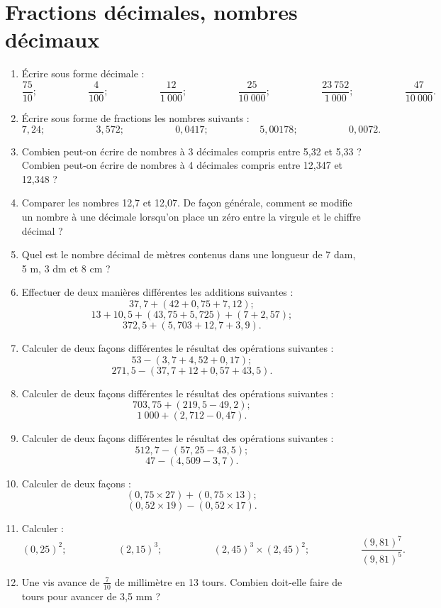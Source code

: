 
 \chapter{Fractions décimales, nombres décimaux}
 
 \begin{enumerate}
 \item Écrire sous forme décimale : 
 \[ \frac{75}{10};\phantom{meowmeow}\frac4{100};\phantom{meowmeow}\frac{12}{1~000};\phantom{meowmeow}\frac{25}{10~000};\phantom{meowmeow}\frac{23~752}{1~000};\phantom{meowmeow}\frac{47}{10~000}.\]
 \item Écrire sous forme de fractions les nombres suivants : 
 \[7,24; \phantom{meowmeow} 3,572;\phantom{meowmeow}
 0,0417;\phantom{meowmeow}5,00178;\phantom{meowmeow}
 0,0072.\]
 \item Combien peut-on écrire de nombres à 3 décimales compris entre 5,32 et 5,33 ? Combien peut-on écrire de nombres à 4 décimales compris entre 12,347 et 12,348 ? 
 \item Comparer les nombres 12,7 et 12,07. De façon générale, comment se modifie un nombre à une décimale lorsqu'on place un zéro entre la virgule et le chiffre décimal ?
 \item Quel est le nombre décimal de mètres contenus dans une longueur de 7 dam, 5 m, 3 dm et 8 cm ? 
 \item Effectuer de deux manières différentes les additions suivantes : 
 \[ 37,7 + (42+0,75+7,12);\] 
 \[ 13 + 10,5 + ( 43, 75 + 5,725) + (7 + 2,57) ; \]
 \[ 372, 5 + ( 5,703 + 12, 7 + 3,9).\]
 \item Calculer de deux façons différentes le résultat des opérations suivantes : 
 \[ 53 - ( 3,7 + 4,52 + 0,17);\]
 \[ 271,5 - (37,7 + 12 + 0,57 + 43,5).\]
 \item Calculer de deux façons différentes le résultat des opérations suivantes : 
 \[ 703,75 + (219,5-49,2);\]
 \[1~000 + (2,712-0,47).\]
 \item Calculer de deux façons différentes le résultat des opérations suivantes : 
 \[ 512,7-(57,25-43,5);\]
 \[47-(4,509-3,7).\]
 \item Calculer de deux façons : 
 \[ (0,75\times 27) + (0,75 \times 13); \]
 \[ (0,52\times 19) - (0,52 \times 17).\]
 \item Calculer : 
 \[ (0,25)^2; \phantom{meowmeow} (2,15)^3; \phantom{meowmeow}
 (2,45)^3 \times (2,45)^2; \phantom{meowmeow}
 \frac{(9,81)^7}{(9,81)^5}.\]
 \item Une vis avance de $\frac7{10}$ de millimètre en 13 tours. Combien doit-elle faire de tours pour avancer de 3,5 mm ? 

\end{enumerate}
